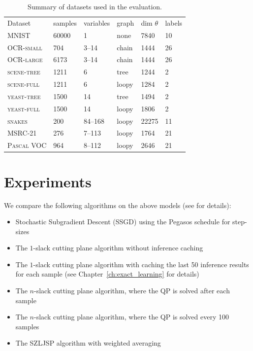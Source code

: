 \begin{table}
    \begin{tabu} to 
    \toprule
    Dataset             & {samples} & variables & graph & {dim $\theta$} & {labels}\\
    MNIST               & 60000   & 1     & none  & 7840  & 10\\
    \textsc{OCR-small}  & 704     & 3--14 & chain & 1444  & 26\\
    \textsc{OCR-large}  & 6173    & 3--14 & chain & 1444  & 26\\
    \textsc{scene-tree} & 1211    & 6     & tree  & 1244  & 2\\
    \textsc{scene-full} & 1211    & 6     & loopy & 1284  & 2\\
    \textsc{yeast-tree} & 1500    & 14    & tree  & 1494  & 2\\
    \textsc{yeast-full} & 1500    & 14    & loopy & 1806  & 2\\
    \textsc{snakes}     & 200     &84--168& loopy & 22275 & 11\\
    MSRC-21             & 276     & 7--113& loopy &  1764 & 21\\
    \textsc{Pascal VOC} & 964     & 8--112& loopy &  2646 & 21\\
    \bottomrule
    \end{tabu}
    \caption{Summary of datasets used in the evaluation. }
\end{table}

\section{Experiments}
We compare the following algorithms on the above models (see  for details):
\begin{itemize}
    \item Stochastic Subgradient Descent (SSGD) using the Pegasos schedule for step-sizes
    \item The $1$-slack cutting plane algorithm without inference caching
    \item The $1$-slack cutting plane algorithm with caching the last 50
        inference results for each sample (see Chapter~\ref{ch:exact_learning}
        for details)
    \item The $n$-slack cutting plane algorithm, where the QP is solved after each sample
    \item The $n$-slack cutting plane algorithm, where the QP is solved every 100 samples
    \item The SZLJSP algorithm with weighted averaging
\end{itemize}

